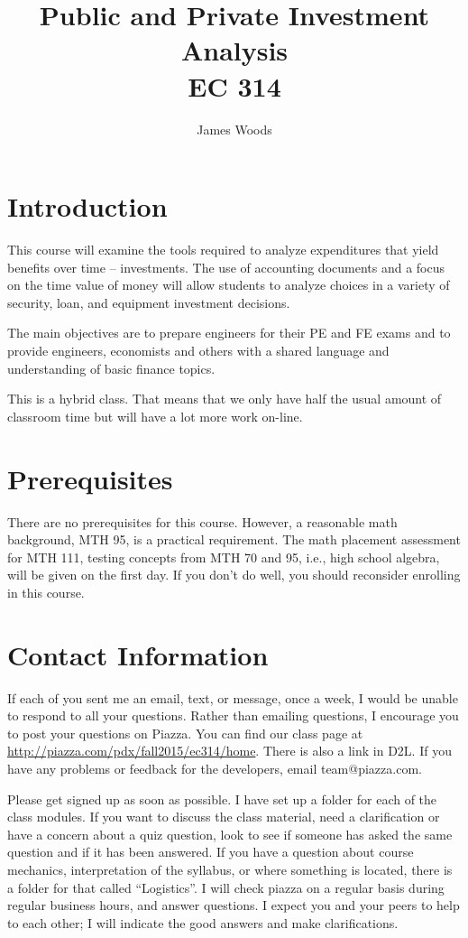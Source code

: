 \documentclass[letterpaper,10pt]{article}
\date{}
\title{Public and Private Investment Analysis\\  
EC 314\\
\Term}
\author{James Woods}
\newcommand{\Piazza}{\url{ http://piazza.com/pdx/fall2015/ec314/home}}
\begin{document}
  
\maketitle

\section{Introduction}

This course will examine the tools required to analyze expenditures
that yield benefits over time -- investments. The use of accounting
documents and a focus on the time value of money will allow students
to analyze choices in a variety of security, loan, and equipment
investment decisions.

The main objectives are to prepare engineers for their PE and FE exams and to
provide engineers, economists and others with a shared language and
understanding of basic finance topics.

This is a hybrid class. That means that we only have half the usual amount of classroom time but will have a lot more work on-line.


\section{Prerequisites}

There are no prerequisites for this course. However, a reasonable math
background, MTH 95, is a practical requirement. 
 The math placement assessment for MTH 111, testing concepts from MTH 70 and 95, i.e., high school algebra, will be given on the first day.  If you don't do well, you should reconsider enrolling in this course.

\section{Contact Information}

If each of you sent me an email, text, or message, once a week, I would be unable to respond to all your questions.  Rather than emailing questions, I encourage you to post your questions on Piazza. You can find our class page at \Piazza.  There is also a link in D2L. If you have any problems or feedback for the developers, email team@piazza.com.

Please get signed up as soon as possible. I have set up a
folder for each of the class modules. If you want to discuss the class material, need a clarification or have a concern about a quiz question, look to see if someone has asked the same question and if it has been answered. 
If you have a question about course mechanics, interpretation of the
syllabus, or where something is located, there is a folder for
that called ``Logistics''. I will check piazza on a regular basis during regular business hours, and answer questions. I expect you and your peers to help to each other; I will indicate the good answers and make clarifications.  
\end{document}
